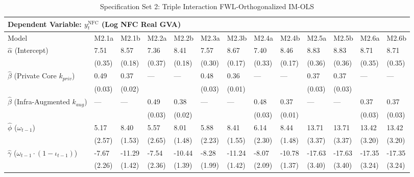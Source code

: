 \begin{table}[H]
\centering
\caption{Specification Set 2: Triple Interaction FWL-Orthogonalized IM-OLS}
\label{tab:spec_set_2}
\scriptsize
\begin{tabular}{p{3.8cm}p{1.5cm}p{1.5cm}p{1.5cm}p{1.5cm}p{1.5cm}p{1.5cm}p{1.5cm}p{1.5cm}p{1.5cm}p{1.5cm}p{1.5cm}p{1.5cm}}
\toprule
\multicolumn{13}{l}{\textbf{Dependent Variable: $y_t^{\text{NFC}}$ (Log NFC Real GVA)}} \\
\midrule
Model & M2.1a & M2.1b & M2.2a & M2.2b & M2.3a & M2.3b & M2.4a & M2.4b & M2.5a & M2.5b & M2.6a & M2.6b  \\
\midrule
$\hat{\alpha}$ (Intercept)  & 7.51 & 8.57 & 7.36 & 8.41 & 7.57 & 8.67 & 7.40 & 8.46 & 8.83 & 8.83 & 8.71 & 8.71  \\
 & {\scriptsize (0.35)} & {\scriptsize (0.18)} & {\scriptsize (0.37)} & {\scriptsize (0.18)} & {\scriptsize (0.30)} & {\scriptsize (0.17)} & {\scriptsize (0.33)} & {\scriptsize (0.17)} & {\scriptsize (0.36)} & {\scriptsize (0.36)} & {\scriptsize (0.35)} & {\scriptsize (0.35)}  \\
$\hat{\beta}$ (Private Core $k_{priv}$)  & 0.49 & 0.37 & --- & --- & 0.48 & 0.36 & --- & --- & 0.37 & 0.37 & --- & ---  \\
 & {\scriptsize (0.03)} & {\scriptsize (0.02)} &  &  & {\scriptsize (0.03)} & {\scriptsize (0.01)} &  &  & {\scriptsize (0.03)} & {\scriptsize (0.03)} &  &   \\
$\hat{\beta}$ (Infra-Augmented $k_{aug}$)  & --- & --- & 0.49 & 0.38 & --- & --- & 0.48 & 0.37 & --- & --- & 0.37 & 0.37  \\
 &  &  & {\scriptsize (0.03)} & {\scriptsize (0.02)} &  &  & {\scriptsize (0.03)} & {\scriptsize (0.01)} &  &  & {\scriptsize (0.03)} & {\scriptsize (0.03)}  \\
$\hat{\phi}$ ($\omega_{t-1}$)  & 5.17 & 8.40 & 5.57 & 8.01 & 5.88 & 8.41 & 6.14 & 8.44 & 13.71 & 13.71 & 13.42 & 13.42  \\
 & {\scriptsize (2.57)} & {\scriptsize (1.53)} & {\scriptsize (2.65)} & {\scriptsize (1.48)} & {\scriptsize (2.23)} & {\scriptsize (1.55)} & {\scriptsize (2.30)} & {\scriptsize (1.48)} & {\scriptsize (3.37)} & {\scriptsize (3.37)} & {\scriptsize (3.20)} & {\scriptsize (3.20)}  \\
$\hat{\gamma}$ ($\omega_{t-1} \cdot (1-\iota_{t-1})$)  & -7.67 & -11.29 & -7.54 & -10.44 & -8.28 & -11.24 & -8.07 & -10.78 & -17.63 & -17.63 & -17.35 & -17.35  \\
 & {\scriptsize (2.26)} & {\scriptsize (1.42)} & {\scriptsize (2.36)} & {\scriptsize (1.39)} & {\scriptsize (1.99)} & {\scriptsize (1.42)} & {\scriptsize (2.09)} & {\scriptsize (1.37)} & {\scriptsize (3.40)} & {\scriptsize (3.40)} & {\scriptsize (3.24)} & {\scriptsize (3.24)}  \\

\end{tabular}
\end{table}
